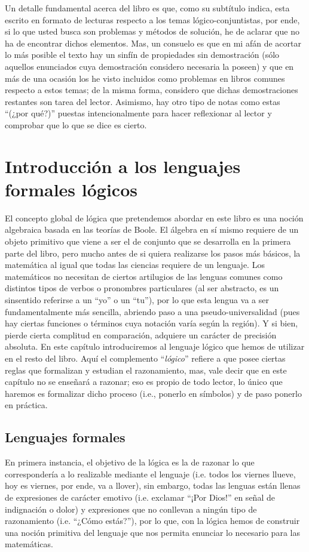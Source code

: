 \documentclass[11pt,a4paper]{book}
\begin{document}
Un detalle fundamental acerca del libro es que, como su subtítulo indica, esta escrito en formato de lecturas respecto a los temas lógico-conjuntistas, por ende, si lo que usted busca son problemas y métodos de solución, he de aclarar que no ha de encontrar dichos elementos. Mas, un consuelo es que en mi afán de acortar lo más posible el texto hay un sinfín de propiedades sin demostración (sólo aquellos enunciados cuya demostración considero necesaria la poseen) y que en más de una ocasión los he visto incluidos como problemas en libros comunes respecto a estos temas; de la misma forma, considero que dichas demostraciones restantes son tarea del lector. Asimismo, hay otro tipo de notas como estas ``(¿por qué?)'' puestas intencionalmente para hacer reflexionar al lector y comprobar que lo que se dice es cierto.

\mainmatter
\chapter[Introducción a los lenguajes formales lógicos]{Introducción a los lenguajes formales lógicos}
El concepto global de lógica que pretendemos abordar en este libro es una noción algebraica basada en las teorías de Boole. El álgebra en sí mismo requiere de un objeto primitivo que viene a ser el de conjunto que se desarrolla en la primera parte del libro, pero mucho antes de si quiera realizarse los pasos más básicos, la matemática al igual que todas las ciencias requiere de un lenguaje. Los matemáticos no necesitan de ciertos artilugios de las lenguas comunes como distintos tipos de verbos o pronombres particulares (al ser abstracto, es un sinsentido referirse a un ``yo'' o un ``tu''), por lo que esta lengua va a ser fundamentalmente más sencilla, abriendo paso a una pseudo-universalidad (pues hay ciertas funciones o términos cuya notación varía según la región). Y si bien, pierde cierta complitud en comparación, adquiere un carácter de precisión absoluta. En este capítulo introduciremos al lenguaje lógico que hemos de utilizar en el resto del libro. Aquí el complemento ``\textit{lógico}'' refiere a que posee ciertas reglas que formalizan y estudian el razonamiento, mas, vale decir que en este capítulo no se enseñará a razonar; eso es propio de todo lector, lo único que haremos es formalizar dicho proceso (i.e., ponerlo en símbolos) y de paso ponerlo en práctica.

\section{Lenguajes formales}
En primera instancia, el objetivo de la lógica es la de razonar lo que correspondería a lo realizable mediante el lenguaje (i.e. todos los viernes llueve, hoy es viernes, por ende, va a llover), sin embargo, todas las lenguas están llenas de expresiones de carácter emotivo (i.e. exclamar ``¡Por Dios!'' en señal de indignación o dolor) y expresiones que no conllevan a ningún tipo de razonamiento (i.e. ``¿Cómo estás?''), por lo que, con la lógica hemos de construir una noción primitiva del lenguaje que nos permita enunciar lo necesario para las matemáticas.
\end{document}
